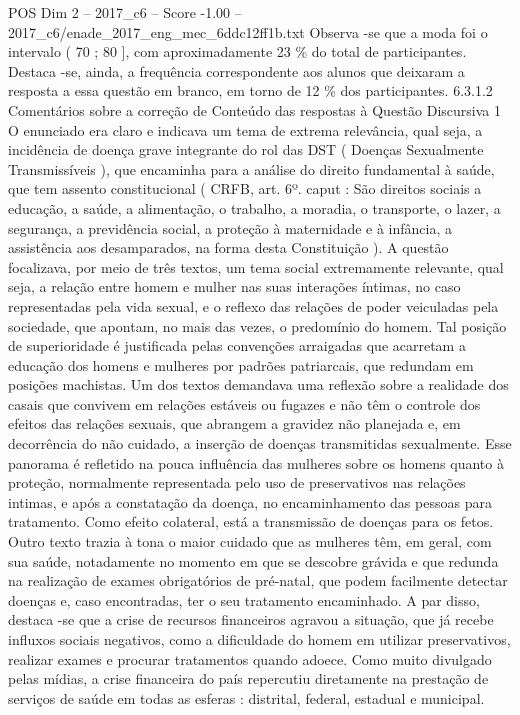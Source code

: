 \begin{textsample}{POS Dim 2 – 2017\_c6 – Score -1.00 – 2017\_c6/enade\_2017\_eng\_mec\_6ddc12ff1b.txt}
Observa -se que a moda foi o intervalo ( 70 ; 80 ], com aproximadamente 23 \% do total de participantes.
Destaca -se, ainda, a frequência correspondente aos alunos que deixaram a resposta a essa questão em branco, em torno de 12 \% dos participantes. 6.3.1.2 Comentários sobre a correção de Conteúdo das respostas à Questão Discursiva 1 O enunciado era claro e indicava um tema de extrema relevância, qual seja, a incidência de doença grave integrante do rol das DST ( Doenças Sexualmente Transmissíveis ), que encaminha para a análise do direito fundamental à saúde, que tem assento constitucional ( CRFB, art. 6º. caput : São direitos sociais a educação, a saúde, a alimentação, o trabalho, a moradia, o transporte, o lazer, a segurança, a previdência social, a proteção à maternidade e à infância, a assistência aos desamparados, na forma desta Constituição ).
A questão focalizava, por meio de três textos, um tema social extremamente relevante, qual seja, a relação entre homem e mulher nas suas interações íntimas, no caso representadas pela vida sexual, e o reflexo das relações de poder veiculadas pela sociedade, que apontam, no mais das vezes, o predomínio do homem.
Tal posição de superioridade é justificada pelas convenções arraigadas que acarretam a educação dos homens e mulheres por padrões patriarcais, que redundam em posições machistas.
Um dos textos demandava uma reflexão sobre a realidade dos casais que convivem em relações estáveis ou fugazes e não têm o controle dos efeitos das relações sexuais, que abrangem a gravidez não planejada e, em decorrência do não cuidado, a inserção de doenças transmitidas sexualmente.
Esse panorama é refletido na pouca influência das mulheres sobre os homens quanto à proteção, normalmente representada pelo uso de preservativos nas relações intimas, e após a constatação da doença, no encaminhamento das pessoas para tratamento.
Como efeito colateral, está a transmissão de doenças para os fetos.
Outro texto trazia à tona o maior cuidado que as mulheres têm, em geral, com sua saúde, notadamente no momento em que se descobre grávida e que redunda na realização de exames obrigatórios de pré-natal, que podem facilmente detectar doenças e, caso encontradas, ter o seu tratamento encaminhado.
A par disso, destaca -se que a crise de recursos financeiros agravou a situação, que já recebe influxos sociais negativos, como a dificuldade do homem em utilizar preservativos, realizar exames e procurar tratamentos quando adoece.
Como muito divulgado pelas mídias, a crise financeira do país repercutiu diretamente na prestação de serviços de saúde em todas as esferas : distrital, federal, estadual e municipal.

\end{textsample}
